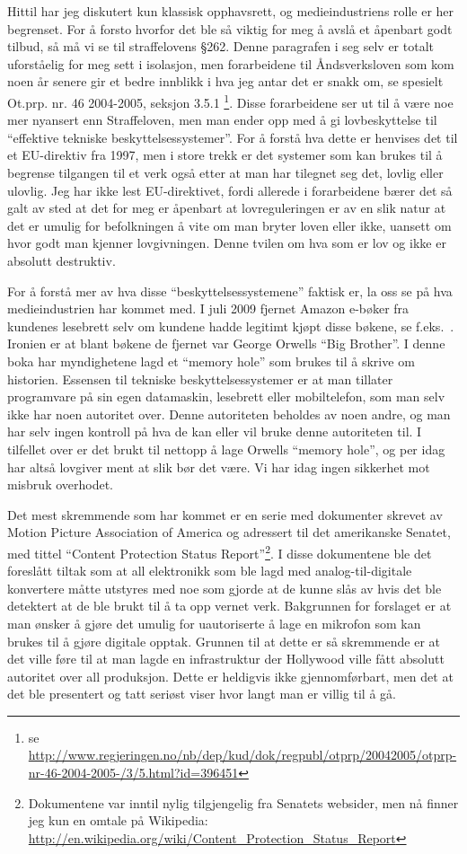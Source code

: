 \documentclass[11pt,norsk,a4paper]{article}
\begin{document}
Hittil har jeg diskutert kun klassisk opphavsrett, og medieindustriens
rolle er her begrenset. For å forsto hvorfor det ble så viktig for meg
å avslå et åpenbart godt tilbud, så må vi se til straffelovens
§262. Denne paragrafen i seg selv er totalt uforståelig for meg sett i
isolasjon, men forarbeidene til Åndsverksloven som kom noen år senere
gir et bedre innblikk i hva jeg antar det er snakk om, se spesielt
Ot.prp. nr. 46 2004-2005, seksjon 3.5.1 \footnote{se
  \url{http://www.regjeringen.no/nb/dep/kud/dok/regpubl/otprp/20042005/otprp-nr-46-2004-2005-/3/5.html?id=396451}}. 
Disse forarbeidene ser ut til å være noe mer nyansert enn
Straffeloven, men man ender opp med å gi lovbeskyttelse til
``effektive tekniske beskyttelsessystemer''. For å forstå hva dette er
henvises det til et EU-direktiv fra 1997, men i store trekk er det
systemer som kan brukes til å begrense tilgangen til et verk også
etter at man har tilegnet seg det, lovlig eller ulovlig. Jeg har ikke
lest EU-direktivet, fordi allerede i forarbeidene bærer det så galt av
sted at det for meg er åpenbart at lovreguleringen er av en slik natur
at det er umulig for befolkningen å vite om man bryter loven eller
ikke, uansett om hvor godt man kjenner lovgivningen. Denne tvilen om
hva som er lov og ikke er absolutt destruktiv. 

For å forstå mer av hva disse ``beskyttelsessystemene'' faktisk er, la
oss se på hva medieindustrien har kommet med.  I juli 2009 fjernet
Amazon e-bøker fra kundenes lesebrett selv om kundene hadde legitimt
kjøpt disse bøkene, se f.eks.~\cite{nytamazon}. Ironien er at blant
bøkene de fjernet var George Orwells ``Big Brother''. I denne boka har
myndighetene lagd et ``memory hole'' som brukes til å skrive om
historien. Essensen til tekniske beskyttelsessystemer er at man
tillater programvare på sin egen datamaskin, lesebrett eller
mobiltelefon, som man selv ikke har noen autoritet over. Denne
autoriteten beholdes av noen andre, og man har selv ingen kontroll på
hva de kan eller vil bruke denne autoriteten til. I tilfellet over er
det brukt til nettopp å lage Orwells ``memory hole'', og per idag har
altså lovgiver ment at slik bør det være. Vi har idag ingen sikkerhet
mot misbruk overhodet. 


Det mest skremmende som har kommet er en serie med dokumenter skrevet
av Motion Picture Association of America og adressert til det
amerikanske Senatet, med tittel ``Content Protection Status
Report''\footnote{Dokumentene var inntil nylig tilgjengelig fra
  Senatets websider, men nå finner jeg kun en omtale på Wikipedia:
  \url{http://en.wikipedia.org/wiki/Content_Protection_Status_Report}}.
I disse dokumentene ble det foreslått tiltak som at all elektronikk
som ble lagd med analog-til-digitale konvertere måtte utstyres med noe
som gjorde at de kunne slås av hvis det ble detektert at de ble brukt
til å ta opp vernet verk. Bakgrunnen for forslaget er at man ønsker å
gjøre det umulig for uautoriserte å lage en mikrofon som kan brukes
til å gjøre digitale opptak. Grunnen til at dette er så skremmende er at
det ville føre til at man lagde en infrastruktur der Hollywood ville
fått absolutt autoritet over all produksjon. Dette er heldigvis ikke
gjennomførbart, men det at det ble presentert og tatt seriøst viser
hvor langt man er villig til å gå. 
\end{document}
